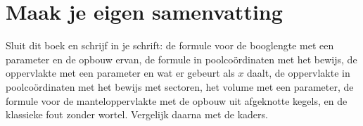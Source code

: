 
\begin{oefeningen}






\end{oefeningen}


\ifzelfstudie
\section*{Maak je eigen samenvatting}
Sluit dit boek en schrijf in je schrift: de formule voor de booglengte met een parameter en de opbouw ervan, de formule in poolcoördinaten met het bewijs, de oppervlakte met een parameter en wat er gebeurt als $x$ daalt, de oppervlakte in poolcoördinaten met het bewijs met sectoren, het volume met een parameter, de formule voor de manteloppervlakte met de opbouw uit afgeknotte kegels, en de klassieke fout zonder wortel. Vergelijk daarna met de kaders.
\fi
